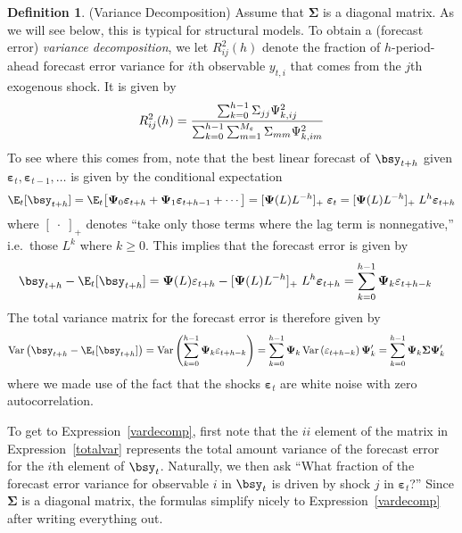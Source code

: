 \documentclass[12pt]{article}
\theoremstyle{plain}
\theoremstyle{definition}
\newtheorem{defn}[thm]{Definition}
\theoremstyle{remark}
\newcommand{\bsSigma}{\boldsymbol{\Sigma}}
\newcommand{\bsvarepsilon}{\boldsymbol{\varepsilon}}
\newcommand{\bsPsi}{\boldsymbol{\Psi}}
\newcommand{\Var}{\operatorname{Var}}
\begin{document}
\begin{defn}(Variance Decomposition)
Assume that $\bsSigma$ is a diagonal matrix. As we will see below, this
is typical for structural models.
To obtain a (forecast error) \emph{variance decomposition}, we let
$R^2_{ij}(h)$ denote the fraction of $h$-period-ahead forecast error
variance for $i$th observable $y_{t,i}$ that comes from the $j$th
exogenous shock. It is given by
\begin{align}
  R^2_{ij}(h)
  =
  \frac{%
    \sum_{k=0}^{h-1}
    \Sigma_{jj} \Psi_{k,ij}^2
  }{%
    \sum_{k=0}^{h-1} \sum_{m=1}^{M_\varepsilon}
    \Sigma_{mm} \Psi_{k,im}^2
  }
  \label{vardecomp}
\end{align}
To see where this comes from, note that the best linear forecast of
$\bsy_{t+h}$ given $\bsvarepsilon_t,\bsvarepsilon_{t-1},\ldots$ is given
by the conditional expectation
\begin{align*}
  \E_t[\bsy_{t+h}]
  =
  \E_t\big[
    \bsPsi_0\bsvarepsilon_{t+h}
    + \bsPsi_1\bsvarepsilon_{t+h-1}
    + \cdots
  \big]
  = [\bsPsi(L)L^{-h}]_+\;\bsvarepsilon_t
  = [\bsPsi(L)L^{-h}]_+\;L^h\bsvarepsilon_{t+h}
\end{align*}
where $[\;\cdot\;]_+$ denotes ``take only those terms where the lag term
is nonnegative,'' i.e.\ those $L^k$ where $k\geq 0$.
This implies that the forecast error is given by
\begin{align*}
  \bsy_{t+h} - \E_t[\bsy_{t+h}]
  &=
  \bsPsi(L)\varepsilon_{t+h}
  - [\bsPsi(L)L^{-h}]_+\;L^h\bsvarepsilon_{t+h}
  =
  \sum_{k=0}^{h-1}
  \bsPsi_k \varepsilon_{t+h-k}
\end{align*}
The total variance matrix for the forecast error is therefore given by
\begin{align}
  \Var\big(
  \bsy_{t+h} - \E_t[\bsy_{t+h}]
  \big)
  &=
  \Var\left(
  \sum_{k=0}^{h-1}
  \bsPsi_k \varepsilon_{t+h-k}
  \right)
  =
  \sum_{k=0}^{h-1} \bsPsi_k \Var\left(
  \varepsilon_{t+h-k}
  \right)\bsPsi_k'
  =
  \sum_{k=0}^{h-1}
  \bsPsi_k\bsSigma \bsPsi_k'
  \label{totalvar}
\end{align}
where we made use of the fact that the shocks $\bsvarepsilon_t$ are
white noise with zero autocorrelation.

To get to Expression~\ref{vardecomp}, first note that the $ii$ element
of the matrix in Expression~\ref{totalvar} represents the total amount
variance of the forecast error for the $i$th element of $\bsy_t$.
Naturally, we then ask ``What fraction of the forecast error variance
for observable $i$ in $\bsy_t$ is driven by shock $j$ in
$\bsvarepsilon_t$?'' Since $\bsSigma$ is a diagonal matrix, the formulas
simplify nicely to Expression~\ref{vardecomp} after writing everything
out.
\end{defn}
\end{document}
